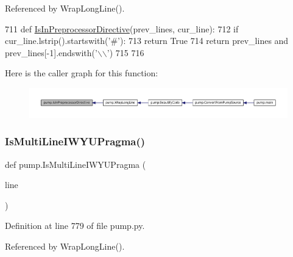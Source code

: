 Referenced by Wrap\+Long\+Line().


\begin{DoxyCode}
711 \textcolor{keyword}{def }\hyperlink{namespacepump_aa33101b01d5781710262f3b5dadd8bc8}{IsInPreprocessorDirective}(prev\_lines, cur\_line):
712   \textcolor{keywordflow}{if} cur\_line.lstrip().startswith(\textcolor{stringliteral}{'#'}):
713     \textcolor{keywordflow}{return} \textcolor{keyword}{True}
714   \textcolor{keywordflow}{return} prev\_lines \textcolor{keywordflow}{and} prev\_lines[-1].endswith(\textcolor{stringliteral}{'\(\backslash\)\(\backslash\)'})
715 
716 
\end{DoxyCode}
Here is the caller graph for this function\+:
\nopagebreak
\begin{figure}[H]
\begin{center}
\leavevmode
\includegraphics[width=350pt]{namespacepump_aa33101b01d5781710262f3b5dadd8bc8_icgraph}
\end{center}
\end{figure}
\mbox{\label{namespacepump_a707a3ff4514c89607e48a87589aed787}} 
\subsubsection{\texorpdfstring{Is\+Multi\+Line\+I\+W\+Y\+U\+Pragma()}{IsMultiLineIWYUPragma()}}
{\footnotesize\ttfamily def pump.\+Is\+Multi\+Line\+I\+W\+Y\+U\+Pragma (\begin{DoxyParamCaption}\item[{}]{line }\end{DoxyParamCaption})}



Definition at line 779 of file pump.\+py.



Referenced by Wrap\+Long\+Line().


